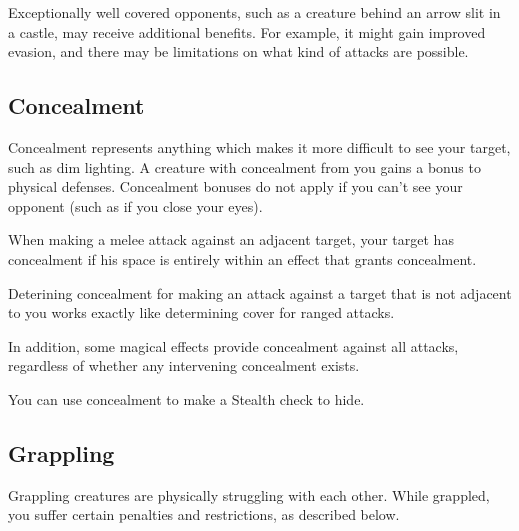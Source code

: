 Exceptionally well covered opponents, such as a creature behind an arrow slit in a castle, may receive additional benefits. For example, it might gain improved evasion, and there may be limitations on what kind of attacks are possible.

\subsection{Concealment}\label{Concealment}
Concealment represents anything which makes it more difficult to see your target, such as dim lighting. A creature with concealment from you gains a  bonus to physical defenses. Concealment bonuses do not apply if you can't see your opponent (such as if you close your eyes).

 When making a melee attack against an adjacent target, your target has concealment if his space is entirely within an effect that grants concealment.

Deterining concealment for making an attack against a target that is not adjacent to you works exactly like determining cover for ranged attacks.

In addition, some magical effects provide concealment against all attacks, regardless of whether any intervening concealment exists.

 You can use concealment to make a Stealth check to hide.

\subsection{Grappling}
Grappling creatures are physically struggling with each other. While grappled, you suffer certain penalties and restrictions, as described below. 


